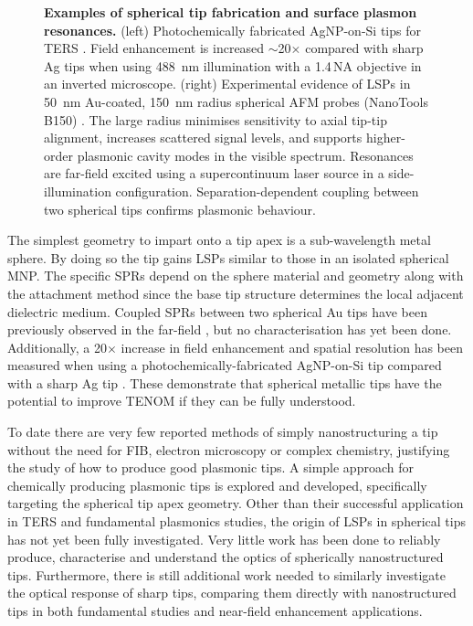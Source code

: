 \documentclass{article}
\begin{document}
\begin{figure}[bt]
\begin{subfigure}[t]{0.6\textwidth}
\end{subfigure}
\caption[Examples of spherical tip fabrication and surface plasmon resonances]{\textbf{Examples of spherical tip fabrication and surface plasmon resonances.} (left) Photochemically fabricated AgNP-on-Si tips for TERS \cite{umakoshi2012}. Field enhancement is increased $\sim$20$\times$ compared with sharp Ag tips when using \SI{488}{nm} illumination with a 1.4\,NA objective in an inverted microscope. (right) Experimental evidence of LSPs in \SI{50}{nm} Au-coated, \SI{150}{nm} radius spherical AFM probes (NanoTools B150) \cite{savage2012}. The large radius minimises sensitivity to axial tip-tip alignment, increases scattered signal levels, and supports higher-order plasmonic cavity modes in the visible spectrum. Resonances are far-field excited using a supercontinuum laser source in a side-illumination configuration. Separation-dependent coupling between two spherical tips confirms plasmonic behaviour.}
\label{fig:savage2012a}
\end{figure}

The simplest geometry to impart onto a tip apex is a sub-wavelength metal sphere. By doing so the tip gains LSPs similar to those in an isolated spherical MNP. The specific SPRs depend on the sphere material and geometry along with the attachment method since the base tip structure determines the local adjacent dielectric medium. Coupled SPRs between two spherical Au tips have been previously observed in the far-field \cite{savage2012}, but no characterisation has yet been done. Additionally, a 20$\times$ increase in field enhancement and spatial resolution has been measured when using a photochemically-fabricated AgNP-on-Si tip compared with a sharp Ag tip \cite{umakoshi2012}. These demonstrate that spherical metallic tips have the potential to improve TENOM if they can be fully understood.

To date there are very few reported methods of simply nanostructuring a tip without the need for FIB, electron microscopy or complex chemistry, justifying the study of how to produce good plasmonic tips. A simple approach for chemically producing plasmonic tips is explored and developed, specifically targeting the spherical tip apex geometry. Other than their successful application in TERS and fundamental plasmonics studies, the origin of LSPs in spherical tips has not yet been fully investigated. Very little work has been done to reliably produce, characterise and understand the optics of spherically nanostructured tips. Furthermore, there is still additional work needed to similarly investigate the optical response of sharp tips, comparing them directly with nanostructured tips in both fundamental studies and near-field enhancement applications.
\end{document}
